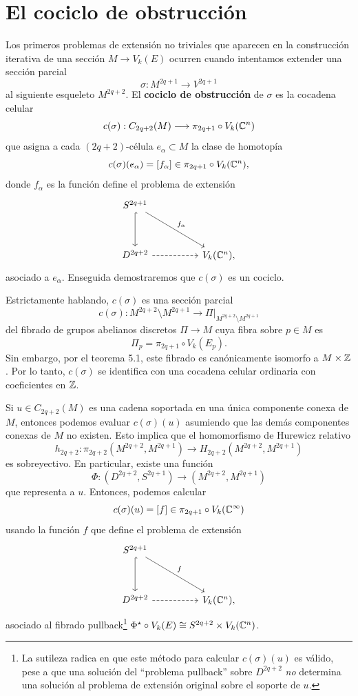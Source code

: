 \section{El cociclo de obstrucción}

Los primeros problemas de extensión no triviales que aparecen en la construcción iterativa de una sección $M \to V_k(E)$ ocurren cuando intentamos extender una sección parcial
$$\sigma : M^{2q+1} \longrightarrow V^{2q+1}$$
al siguiente esqueleto $M^{2q+2}$. El \textbf{cociclo de obstrucción} de $\sigma$ es la cocadena celular
$$c(\sigma) : C_{2q+2}(M) \longrightarrow \pi_{2q+1} \circ V_k(\mathbb C^n)$$
que asigna a cada $(2q+2)$-célula $e_\alpha \subset M$ la clase de homotopía
$$c(\sigma)(e_\alpha) = [f_\alpha] \in \pi_{2q+1} \circ V_k(\mathbb C^n),$$
donde $f_\alpha$ es la función define el problema de extensión
$$
\begin{tikzcd}[row sep = huge, column sep = huge]
    S^{2q+1} \arrow[d, hook] \arrow[rd, "f_\alpha"] \\
    D^{2q+2} \arrow[r, dashed] & V_k(\C^n),
\end{tikzcd}
$$
asociado a $e_\alpha$. Enseguida demostraremos que $c(\sigma)$ es un cociclo.

\begin{remark}
Estrictamente hablando, $c(\sigma)$ es una sección parcial
$$c(\sigma) : M^{2q+2} \setminus M^{2q+1} \longrightarrow \Pi \big \vert_{M^{2q+2} \setminus M^{2q+1}}$$
del fibrado de grupos abelianos discretos $\Pi \to M$ cuya fibra sobre $p \in M$ es
$$\Pi_p = \pi_{2q+1} \circ V_k(E_p).$$
Sin embargo, por el teorema 5.1, este fibrado es canónicamente isomorfo a $M \times \mathbb Z$. Por lo tanto, $c(\sigma)$ se identifica con una cocadena celular ordinaria con coeficientes en $\mathbb Z$.
\end{remark}

Si $u \in C_{2q+2}(M)$ es una cadena soportada en una única componente conexa de $M$, entonces podemos evaluar $c(\sigma)(u)$ asumiendo que las demás componentes conexas de $M$ no existen. Esto implica que el homomorfismo de Hurewicz relativo \cite[p. 371]{hatcher1}
$$h_{2q+2} : \pi_{2q+2}(M^{2q+2}, M^{2q+1}) \longrightarrow H_{2q+2}(M^{2q+2}, M^{2q+1})$$
es sobreyectivo. En particular, existe una función
$$\Phi : (D^{2q+2}, S^{2q+1}) \longrightarrow (M^{2q+2}, M^{2q+1})$$
que representa a $u$. Entonces, podemos calcular
$$c(\sigma)(u) = [f] \in \pi_{2q+1} \circ V_k(\mathbb C^\infty)$$
usando la función $f$ que define el problema de extensión
$$
\begin{tikzcd}[row sep = huge, column sep = huge]
    S^{2q+1} \arrow[d, hook] \arrow[rd, "f"] \\
    D^{2q+2} \arrow[r, dashed] & V_k(\C^n),
\end{tikzcd}
$$
asociado al fibrado pullback\footnote{La sutileza radica en que este método para calcular $c(\sigma)(u)$ es válido, pese a que una solución del ``problema pullback'' sobre $D^{2q+2}$ \textit{no} determina una solución al problema de extensión original sobre el soporte de $u$.} $\Phi^\star \circ V_k(E) \cong S^{2q+2} \times V_k(\mathbb C^n)$.

